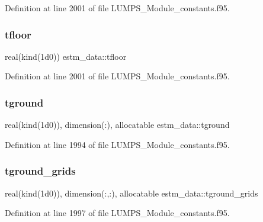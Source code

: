 Definition at line 2001 of file L\+U\+M\+P\+S\+\_\+\+Module\+\_\+constants.\+f95.

\mbox{\label{namespaceestm__data_aa876704e968921da60f59a48ed4b1280}} 
\subsubsection{\texorpdfstring{tfloor}{tfloor}}
{\footnotesize\ttfamily real(kind(1d0)) estm\+\_\+data\+::tfloor}



Definition at line 2001 of file L\+U\+M\+P\+S\+\_\+\+Module\+\_\+constants.\+f95.

\mbox{\label{namespaceestm__data_a31cf901029f7f3a0a3113c0e2dbd6d90}} 
\subsubsection{\texorpdfstring{tground}{tground}}
{\footnotesize\ttfamily real(kind(1d0)), dimension(\+:), allocatable estm\+\_\+data\+::tground}



Definition at line 1994 of file L\+U\+M\+P\+S\+\_\+\+Module\+\_\+constants.\+f95.

\mbox{\label{namespaceestm__data_a2c342d468651c63c5454191631e29c13}} 
\subsubsection{\texorpdfstring{tground\+\_\+grids}{tground\_grids}}
{\footnotesize\ttfamily real(kind(1d0)), dimension(\+:,\+:), allocatable estm\+\_\+data\+::tground\+\_\+grids}



Definition at line 1997 of file L\+U\+M\+P\+S\+\_\+\+Module\+\_\+constants.\+f95.

\mbox{\label{namespaceestm__data_a0c35cb0c35299e4396912d865e3f8e99}} 

